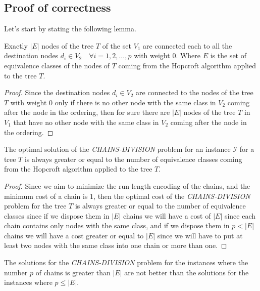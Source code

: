 \subsection{Proof of correctness}
Let's start by stating the following lemma.

\begin{lemma} \label{lemma:all_destinations}
    Exactly $|E|$ nodes of the tree $T$ of the set $V_1$ are connected each to all the destination nodes $d_i \in V_2 \quad \forall i = 1, 2, \dots, p$ with weight $0$. Where $E$ is the set of equivalence classes of the nodes of $T$ coming from the Hopcroft algorithm applied to the tree $T$.
\end{lemma}

\begin{proof}
    Since the destination nodes $d_i \in V_2$ are connected to the nodes of the tree $T$ with weight $0$ only if there is no other node with the same class in $V_2$ coming after the node in the ordering, then for sure there are $|E|$ nodes of the tree $T$ in $V_1$ that have no other node with the same class in $V_2$ coming after the node in the ordering.
\end{proof}

\begin{lemma} \label{lemma:optimal_cost}
    The optimal solution of the \textit{CHAINS-DIVISION} problem for an instance $\mathcal I$ for a tree $T$ is always greater or equal to the number of equivalence classes coming from the Hopcroft algorithm applied to the tree $T$.
\end{lemma}

\begin{proof}
    Since we aim to minimize the run length encoding of the chains, and the minimum cost of a chain is $1$, then the optimal cost of the \textit{CHAINS-DIVISION} problem for the tree $T$ is always greater or equal to the number of equivalence classes since if we dispose them in $|E|$ chains we will have a cost of $|E|$ since each chain contains only nodes with the same class, and if we dispose them in $p < |E|$ chains we will have a cost greater or equal to $|E|$ since we will have to put at least two nodes with the same class into one chain or more than one.
\end{proof}

\begin{lemma} \label{lemma:p_less_than_E}
    The solutions for the \textit{CHAINS-DIVISION} problem for the instances where the number $p$ of chains is greater than $|E|$ are not better than the solutions for the instances where $p \leq |E|$.
\end{lemma}

